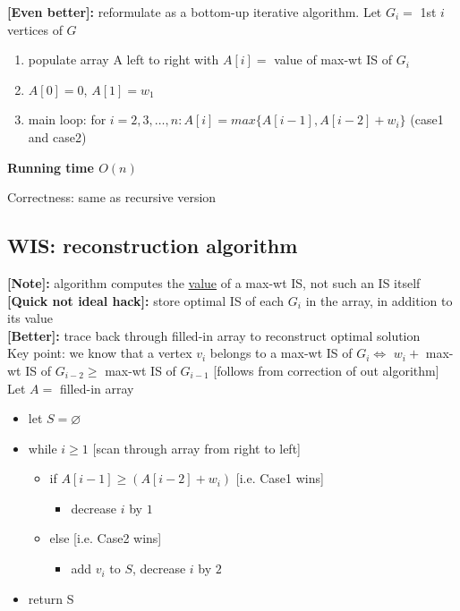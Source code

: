 \documentclass[a4paper,12pt]{article}
\theoremstyle{plain}
\theoremstyle{definition}
\theoremstyle{remark}
\begin{document}
\textbf{[Even better]:} reformulate as a bottom-up iterative algorithm. Let $G_i =$ 1st $i$ vertices of $G$
\begin{enumerate}
	\item populate array A left to right with $A[i] =$ value of max-wt IS of $G_i$
	\item $A[0] = 0$, $A[1] = w_1$
	\item main loop: for $i = 2, 3, \dots, n: A[i] = max\{A[i-1], A[i-2]+w_i\}$ (case1 and case2)
\end{enumerate}

\textbf{Running time $O(n)$}

Correctness: same as recursive version



\subsection{WIS: reconstruction algorithm}
\textbf{[Note]:} algorithm computes the \underline{value} of a max-wt IS, not such an IS itself
\\

\textbf{[Quick not ideal hack]:} store optimal IS of each $G_i$ in the array, in addition to its value
\\

\textbf{[Better]:} trace back through filled-in array to reconstruct optimal solution
\\

Key point: we know that a vertex $v_i$ belongs to a max-wt IS of $G_i \iff$ $w_i +$ max-wt IS of $G_{i-2} \geq$ max-wt IS of $G_{i-1}$ [follows from correction of out algorithm]
\\

Let $A =$ filled-in array
\begin{itemize}
	\item let $S = \varnothing$
	\item while $i \geq 1$ [scan through array from right to left]
	\begin{itemize}
		\item if $A[i-1] \geq (A[i-2]+w_i)$ [i.e. Case1 wins]
		\begin{itemize}
			\item decrease $i$ by $1$
		\end{itemize}
		\item else [i.e. Case2 wins]
		\begin{itemize}
			\item add $v_i$ to $S$, decrease $i$ by $2$
		\end{itemize}
	\end{itemize}
	\item return S
\end{itemize}
\end{document}
